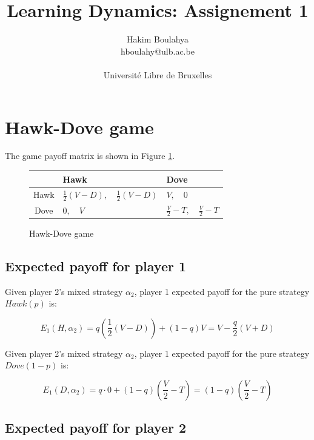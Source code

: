 \documentclass[letterpaper]{article}
\title{Learning Dynamics: Assignement 1}
\author{\Large Hakim Boulahya \\
hboulahy@ulb.ac.be\\
\\
Université Libre de Bruxelles
}
\begin{document}
\maketitle
\tableofcontents
\section{Hawk-Dove game}

The game payoff matrix is shown in Figure \ref{fig:hawkdove}.

\begin{figure}[!ht]


\begin{center}
\begin{tabular}{|c|C|C|}
    \hline
     & Hawk & Dove \\[10pt]
    \hline
    Hawk & $\frac{1}{2}(V - D), \quad \frac{1}{2}(V - D)$ & $V, \quad 0$\\[10pt]
    \hline
    Dove & $0, \quad V$ & $\frac{V}{2} - T, \quad \frac{V}{2} - T$\\[10pt]
    \hline
\end{tabular}
\end{center}

\caption{Hawk-Dove game}
\label{fig:hawkdove}
\end{figure}

\subsection{Expected payoff for player 1}

Given player 2’s mixed strategy $\alpha_2$, player 1 expected payoff
for the pure strategy $Hawk(p)$ is:

\begin{equation}
    E_1(H, \alpha_2) = q (\frac{1}{2}(V - D)) + (1 - q)V
    = V - \frac{q}{2}(V + D)
\end{equation}

Given player 2’s mixed strategy $\alpha_2$, player 1 expected payoff
for the pure strategy $Dove(1 - p)$ is:

\begin{equation}
    E_1(D, \alpha_2) = q \cdot 0 + (1 - q)(\frac{V}{2} - T)
    = (1 - q)(\frac{V}{2} - T)
\end{equation}

\subsection{Expected payoff for player 2}
\end{document}
